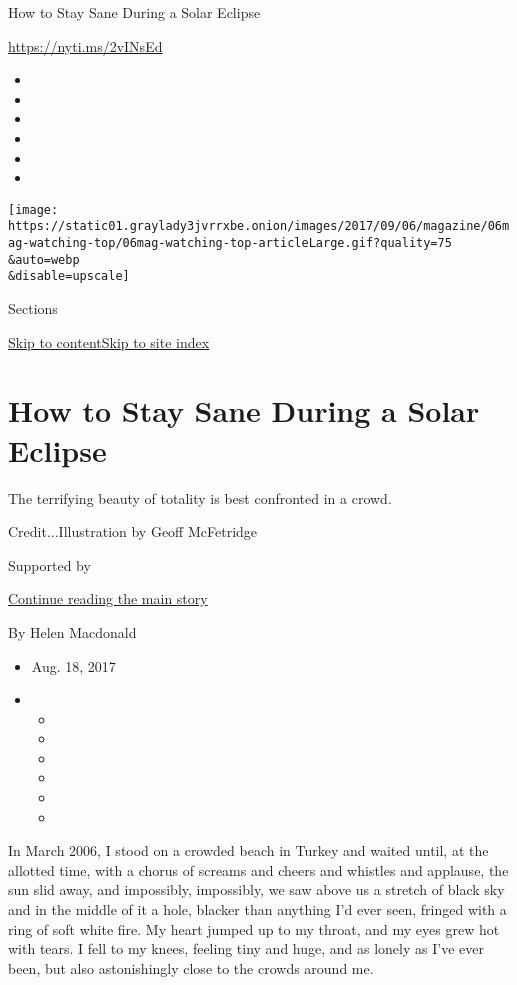 How to Stay Sane During a Solar Eclipse

\url{https://nyti.ms/2vINsEd}

\begin{itemize}
\item
\item
\item
\item
\item
\item
\end{itemize}

\texttt{[image: https://static01.graylady3jvrrxbe.onion/images/2017/09/06/magazine/06mag-watching-top/06mag-watching-top-articleLarge.gif?quality=75\\\&auto=webp\\\&disable=upscale]}

Sections

\protect\hyperlink{site-content}{Skip to
content}\protect\hyperlink{site-index}{Skip to site index}

\hypertarget{how-to-stay-sane-during-a-solar-eclipse}{%
\section{How to Stay Sane During a Solar
Eclipse}\label{how-to-stay-sane-during-a-solar-eclipse}}

The terrifying beauty of totality is best confronted in a crowd.

Credit...Illustration by Geoff McFetridge

Supported by

\protect\hyperlink{after-sponsor}{Continue reading the main story}

By Helen Macdonald

\begin{itemize}
\item
  Aug. 18, 2017
\item
  \begin{itemize}
  \item
  \item
  \item
  \item
  \item
  \item
  \end{itemize}
\end{itemize}

In March 2006, I stood on a crowded beach in Turkey and waited until, at
the allotted time, with a chorus of screams and cheers and whistles and
applause, the sun slid away, and impossibly, impossibly, we saw above us
a stretch of black sky and in the middle of it a hole, blacker than
anything I'd ever seen, fringed with a ring of soft white fire. My heart
jumped up to my throat, and my eyes grew hot with tears. I fell to my
knees, feeling tiny and huge, and as lonely as I've ever been, but also
astonishingly close to the crowds around me.

